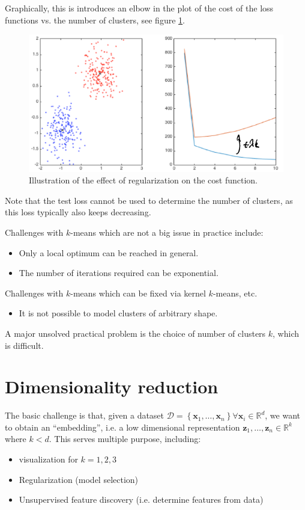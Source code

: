 \documentclass[a4paper,10pt,twoside]{article}
\begin{document}
Graphically, this is introduces an elbow in the plot of the cost of the loss functions vs. the number of clusters, see figure \ref{regularization_k_means}.

\begin{figure}
    \centering
    \includegraphics[width=.5\textwidth]{figures/regularization_k_means.png}
    \caption{Illustration of the effect of regularization on the cost function.}
    \label{regularization_k_means}
\end{figure}

Note that the test loss cannot be used to determine the number of clusters, as this loss typically also keeps decreasing.

Challenges with $k$-means which are not a big issue in practice include:
\begin{itemize}
    \item Only a local optimum can be reached in general.
    \item The number of iterations required can be exponential.
\end{itemize}
Challenges with $k$-means which can be fixed via kernel $k$-means, etc.
\begin{itemize}
    \item It is not possible to model clusters of arbitrary shape.
\end{itemize}
A major unsolved practical problem is the choice of number of clusters $k$, which is difficult.

\section{Dimensionality reduction}

The basic challenge is that, given a dataset $\mathcal{D}=\left\{\mathbf{x}_1,\ldots, \mathbf{x}_n\right\}\forall\mathbf{x}_i\in\mathbb{R}^{d}$, we want to obtain an ``embedding'', i.e. a low dimensional representation $\mathbf{z}_1, \ldots, \mathbf{z}_n\in\mathbb{R}^k$ where $k<d$. This serves multiple purpose, including:
\begin{itemize}
    \item visualization for $k=1,2,3$
    \item Regularization (model selection)
    \item Unsupervised feature discovery (i.e. determine features from data)
\end{itemize}
\end{document}
